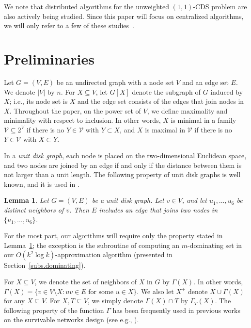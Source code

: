 \documentclass[11pt]{article}
\newcommand{\Vfam}{\mathcal{V}}
\newtheorem{lemma}{Lemma}
\begin{document}
We note that 
distributed algorithms for
the unweighted $(1,1)$-CDS problem are also actively being studied.
Since this paper will focus on centralized algorithms,
we will only refer to a few of these
studies~\cite{Alzoubi02,FunkeKMS06,YuJYLC2015}.


 \section{Preliminaries}
 \label{sec.prelim}

 
 Let $G=(V,E)$ be an undirected graph with a node set $V$ and an edge
 set $E$.
 We denote $|V|$ by $n$.
 For $X \subseteq V$, let $G[X]$ denote the subgraph of $G$
 induced by $X$; i.e., its node set is $X$ and the edge set consists of
 the edges that join nodes in $X$.
 Throughout the paper, on the power set of $V$, we define maximality and minimality
with respect to inclusion.
 In other words, $X$ is minimal in a family $\Vfam \subseteq 2^V$
 if there is no $Y \in \Vfam$ with $Y \subset X$,
 and $X$ is maximal in $\Vfam$ if there is no $Y\in \Vfam$
 with $X \subset Y$.

 In a \emph{unit disk graph}, each node is placed on the two-dimensional
 Euclidean space,
 and two nodes are joined by an edge if and only if the distance between
 them is not larger than a unit length.
 The following property of unit disk graphs is well known,
 and it is used in \cite{Shang:2007jg}.

 \begin{lemma}\label{lem.kissingnum}
  Let $G=(V,E)$ be a unit disk graph. Let $v \in V$,
  and let $u_1,\ldots,u_6$ be distinct neighbors of $v$.
  Then $E$ includes an edge that joins two nodes in $\{u_1,\ldots,u_6\}$.
 \end{lemma}

 For the most part, our algorithms will require only the property stated
 in Lemma~\ref{lem.kissingnum}; the exception is the subroutine
 of computing an $m$-dominating set
 in our $O(k^2 \log k)$-approximation algorithm
 (presented in Section~\ref{subs.dominating}).
 
For $X \subseteq V$, we denote the set of neighbors of $X$ in $G$ by $\Gamma(X)$. In
other words, $\Gamma(X)=\{v \in V\setminus X \colon uv \in E \text{ for
some } u \in X\}$.
We also let $X^+$ denote $X \cup \Gamma(X)$ for any $X \subseteq V$.
For $X,T \subseteq V$, we simply denote $\Gamma(X) \cap T$ by
$\Gamma_T(X)$.
The following property of the function $\Gamma$
has been frequently used in previous works on the survivable networks
design (see e.g., \cite{Nutov12}).
\end{document}
